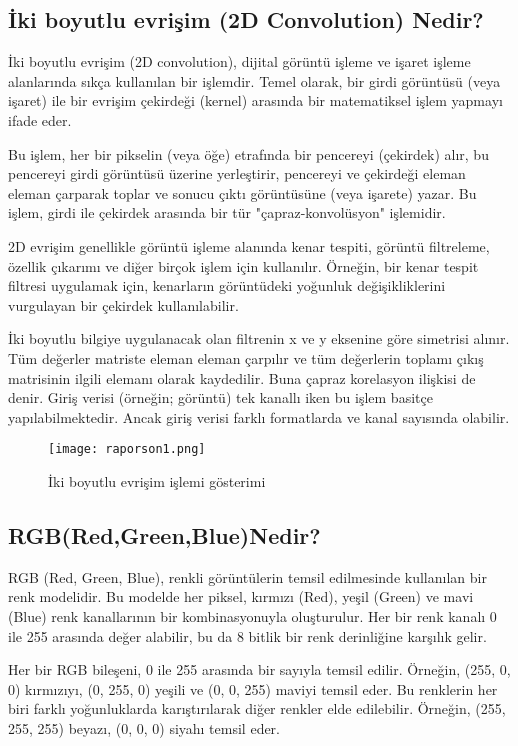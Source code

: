 \documentclass[12pt]{article}
\begin{document}
\subsection{İki boyutlu evrişim (2D Convolution) Nedir?}

İki boyutlu evrişim (2D convolution), dijital görüntü işleme ve işaret işleme alanlarında sıkça kullanılan bir işlemdir. Temel olarak, bir girdi görüntüsü (veya işaret) ile bir evrişim çekirdeği (kernel) arasında bir matematiksel işlem yapmayı ifade eder.

Bu işlem, her bir pikselin (veya öğe) etrafında bir pencereyi (çekirdek) alır, bu pencereyi girdi görüntüsü üzerine yerleştirir, pencereyi ve çekirdeği eleman eleman çarparak toplar ve sonucu çıktı görüntüsüne (veya işarete) yazar. Bu işlem, girdi ile çekirdek arasında bir tür "çapraz-konvolüsyon" işlemidir.

2D evrişim genellikle görüntü işleme alanında kenar tespiti, görüntü filtreleme, özellik çıkarımı ve diğer birçok işlem için kullanılır. Örneğin, bir kenar tespit filtresi uygulamak için, kenarların görüntüdeki yoğunluk değişikliklerini vurgulayan bir çekirdek kullanılabilir.

İki boyutlu bilgiye uygulanacak olan filtrenin x ve y eksenine göre simetrisi alınır. Tüm değerler matriste eleman eleman çarpılır ve tüm değerlerin toplamı çıkış matrisinin ilgili elemanı olarak kaydedilir. Buna çapraz korelasyon ilişkisi de denir. Giriş verisi (örneğin; görüntü) tek kanallı iken bu işlem basitçe yapılabilmektedir. Ancak giriş verisi farklı formatlarda ve kanal sayısında olabilir.
\begin{figure}[h]
    \centering
    \texttt{[image: raporson1.png]}
    \caption{İki boyutlu evrişim işlemi gösterimi}
    \label{fig:enter-label}
\end{figure} 
\newpage
\subsection{RGB(Red,Green,Blue)Nedir?}

RGB (Red, Green, Blue), renkli görüntülerin temsil edilmesinde kullanılan bir renk modelidir. Bu modelde her piksel, kırmızı (Red), yeşil (Green) ve mavi (Blue) renk kanallarının bir kombinasyonuyla oluşturulur. Her bir renk kanalı 0 ile 255 arasında değer alabilir, bu da 8 bitlik bir renk derinliğine karşılık gelir.

Her bir RGB bileşeni, 0 ile 255 arasında bir sayıyla temsil edilir. Örneğin, (255, 0, 0) kırmızıyı, (0, 255, 0) yeşili ve (0, 0, 255) maviyi temsil eder. Bu renklerin her biri farklı yoğunluklarda karıştırılarak diğer renkler elde edilebilir. Örneğin, (255, 255, 255) beyazı, (0, 0, 0) siyahı temsil eder.
\end{document}
